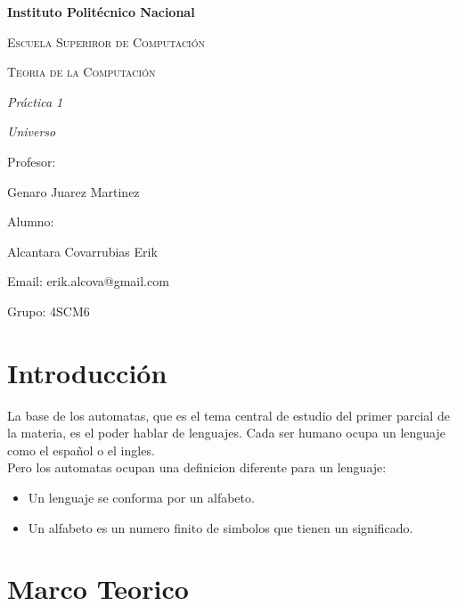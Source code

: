 \documentclass{article}
\begin{document}
\begin{titlepage}
\centering

{\bfseries\LARGE Instituto Polit\'ecnico Nacional \par}
\vspace{1cm}
{\scshape\Large Escuela Superiror de Computaci\'on \par}
\vspace{3cm}
{\scshape\Large Teoria de la Computaci\'on \par}
\vspace{3cm}
{\itshape\Large Pr\'actica 1 \par}
{\itshape\Large Universo \par}
\vfill
{\Large Profesor: \par}
{\Large Genaro Juarez Martinez \par}
{\Large Alumno: \par}
{\Large Alcantara Covarrubias Erik \par}
{\Large Email: erik.alcova@gmail.com \par}
{\Large Grupo: 4SCM6\par}
\vfill
\end{titlepage}

\tableofcontents

\newpage

\section{Introducción}
La base de los automatas, que es el tema central de estudio del primer parcial de la materia, es el poder hablar de lenguajes. Cada ser humano ocupa un lenguaje como el español o el ingles. 
\\Pero los automatas ocupan una definicion diferente para un lenguaje:
\begin{itemize}
    \item Un lenguaje se conforma por un alfabeto.
    \item Un alfabeto es un numero finito de simbolos que tienen un significado.
\end{itemize}

\section{Marco Teorico}
\end{document}
